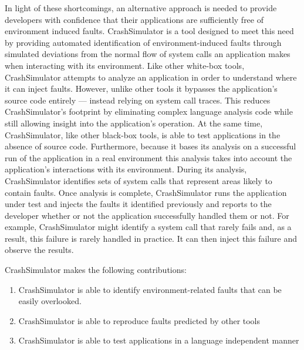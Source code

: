     In light of these shortcomings, an alternative approach is needed to provide developers with confidence that their
    applications are sufficiently free of environment induced faults.  CrashSimulator is a tool designed to meet this
    need by providing automated identification of environment-induced faults through simulated deviations from the
    normal flow of system calls an application makes when interacting with its environment. Like other white-box tools,
    CrashSimulator attempts to analyze an application in order to understand where it can inject faults.  However,
    unlike other tools it bypasses the application's source code entirely --- instead relying on system call traces.
    This reduces CrashSimulator's footprint by eliminating complex language analysis code while still allowing insight
    into the application's operation. At the same time, CrashSimulator, like other black-box tools, is able to test
    applications in the absence of source code. Furthermore, because it bases its analysis on a successful run of the
    application in a real environment this analysis takes into account the application's interactions with its
    environment. During its analysis, CrashSimulator identifies sets of system calls that represent areas likely to
    contain faults. Once analysis is complete, CrashSimulator runs the application under test and injects the faults it
    identified previously and reports to the developer whether or not the application successfully handled them or not.
    For example, CrashSimulator might identify a system call that rarely fails and, as a result, this failure is rarely
    handled in practice. It can then inject this failure and observe the results.

    CrashSimulator makes the following contributions:

    \begin{enumerate}
        \item{CrashSimulator is able to identify environment-related faults that can be easily overlooked.}
        \item{CrashSimulator is able to reproduce faults predicted by other tools}
        \item{CrashSimulator is able to test applications in a language independent manner}
    \end{enumerate}
